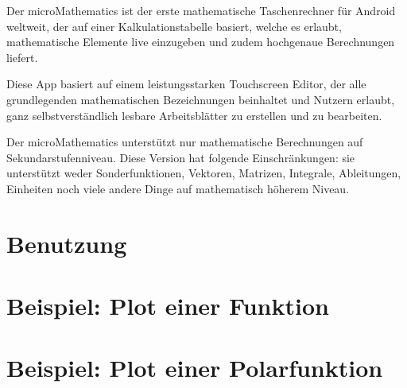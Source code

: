 \documentclass[DIV=calc, paper=a4, fontsize=11pt, twocolumn]{scrartcl}
\begin{document}
\maketitle
\thispagestyle{fancy} %

\begin{bf}
Der microMathematics ist der erste mathematische
Taschenrechner für Android weltweit, der auf einer Kalkulationstabelle basiert,
welche es erlaubt, mathematische Elemente live einzugeben und zudem hochgenaue
Berechnungen liefert.

Diese App basiert auf einem leistungsstarken Touchscreen Editor, der alle
grundlegenden mathematischen Bezeichnungen beinhaltet und Nutzern erlaubt, ganz
selbstverständlich lesbare Arbeitsblätter zu erstellen und zu bearbeiten.

Der microMathematics unterstützt nur mathematische Berechnungen auf
Sekundarstufenniveau. Diese Version hat folgende Einschränkungen: sie
unterstützt weder Sonderfunktionen, Vektoren, Matrizen, Integrale, Ableitungen,
Einheiten noch viele andere Dinge auf mathematisch höherem Niveau.
\end{bf}

\section{Benutzung}


\section{Beispiel: Plot einer Funktion}


\section{Beispiel: Plot einer Polarfunktion}

\end{document}
